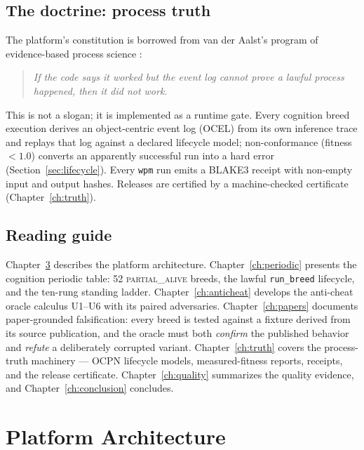 \documentclass[11pt,oneside]{report}
\newcommand{\wpm}{\texttt{wpm}}
\begin{document}
\section{The doctrine: process truth}

The platform's constitution is borrowed from van der Aalst's program of
evidence-based process science \cite{vdaalst2016,ocel2}:

\begin{quote}
\itshape If the code says it worked but the event log cannot prove a lawful
process happened, then it did not work.
\end{quote}

This is not a slogan; it is implemented as a runtime gate. Every cognition
breed execution derives an object-centric event log (OCEL) from its own
inference trace and replays that log against a declared lifecycle model;
non-conformance (fitness $< 1.0$) converts an apparently successful run into
a hard error (Section~\ref{sec:lifecycle}). Every \wpm{} run emits a BLAKE3
receipt with non-empty input and output hashes. Releases are certified by a
machine-checked certificate (Chapter~\ref{ch:truth}).

\section{Reading guide}

Chapter~\ref{ch:arch} describes the platform architecture.
Chapter~\ref{ch:periodic} presents the cognition periodic table: 52
\textsc{partial\_alive} breeds, the lawful \texttt{run\_breed} lifecycle, and
the ten-rung standing ladder. Chapter~\ref{ch:anticheat} develops the
anti-cheat oracle calculus U1--U6 with its paired adversaries.
Chapter~\ref{ch:papers} documents paper-grounded falsification: every breed
is tested against a fixture derived from its source publication, and the
oracle must both \emph{confirm} the published behavior and \emph{refute} a
deliberately corrupted variant. Chapter~\ref{ch:truth} covers the
process-truth machinery --- OCPN lifecycle models, measured-fitness reports,
receipts, and the release certificate. Chapter~\ref{ch:quality} summarizes
the quality evidence, and Chapter~\ref{ch:conclusion} concludes.

\chapter{Platform Architecture}
\label{ch:arch}
\end{document}
